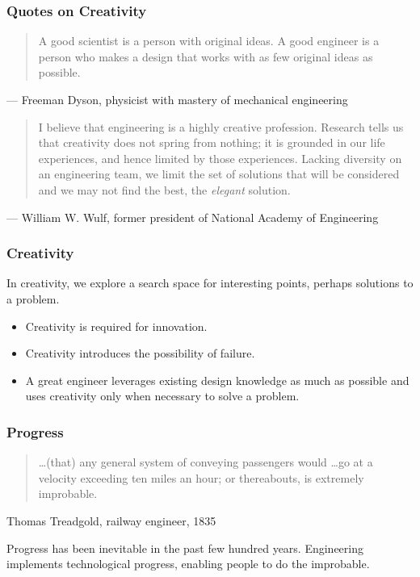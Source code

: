 \begin{frame}
\frametitle{Quotes on Creativity} 
\begin{quote}
A good scientist is a person with original ideas.  A good engineer is a person who makes a design that works with as few original ideas as possible.
\end{quote}
{\hfill \scriptsize --- Freeman Dyson, physicist with mastery of mechanical engineering}

\begin{quote}
I believe that engineering is a highly creative profession. Research tells 
us that creativity does not spring from nothing; it is grounded in our 
life experiences, and hence limited by those experiences. Lacking 
diversity on an engineering team, we limit the set of solutions that 
will be considered and we may not find the best, the \emph{elegant}
solution.
\end{quote}
{\hfill \scriptsize --- William W. Wulf, former president of National Academy of Engineering}
\end{frame}

\begin{frame}
\frametitle{Creativity} 
\begin{changemargin}{1.4cm}
In creativity, we explore a search space for interesting points, perhaps
solutions to a problem.\\[1em]
\begin{itemize}
\item Creativity is required for innovation.
\item Creativity introduces the possibility of failure.
\item A great engineer leverages existing design knowledge as
much as possible and uses creativity only when necessary to solve a problem.
\end{itemize}
\end{changemargin}

\end{frame}


\begin{frame}
\frametitle{Progress}
\begin{quote} 
\ldots (that) any general system of conveying passengers would \ldots go at a velocity exceeding ten miles an hour; or thereabouts, is extremely improbable.
\end{quote}
{\scriptsize \hfill Thomas Treadgold, railway engineer, 1835}
\\[1em]

\begin{changemargin}{1.4cm}
Progress has been inevitable in the past few hundred years. Engineering
implements technological progress, enabling people to do the improbable.
\end{changemargin}

\end{frame}

